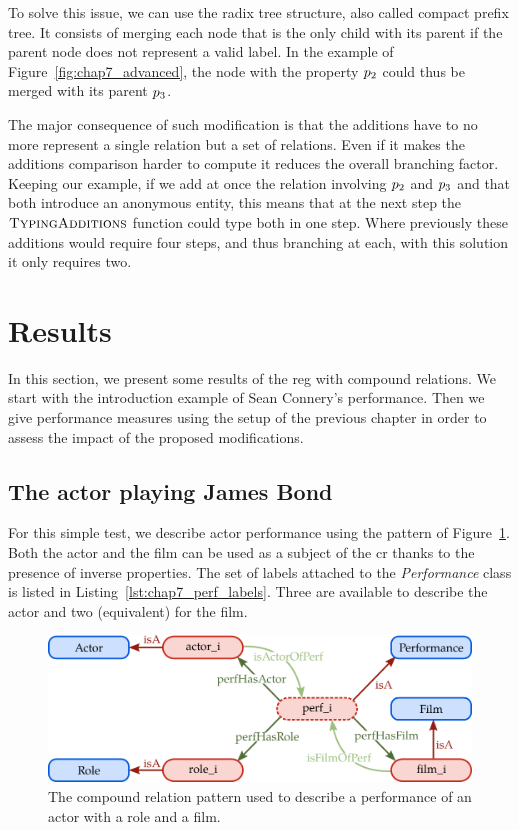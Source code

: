 To solve this issue, we can use the radix tree structure, also called compact prefix tree. It consists of merging each node that is the only child with its parent if the parent node does not represent a valid label. In the example of Figure~\ref{fig:chap7_advanced}, the node with the property $p_2$ could thus be merged with its parent $p_3$.

The major consequence of such modification is that the additions have to no more represent a single relation but a set of relations. Even if it makes the additions comparison harder to compute it reduces the overall branching factor. Keeping our example, if we add at once the relation involving $p_2$ and $p_3$ and that both introduce an anonymous entity, this means that at the next step the $\textsc{TypingAdditions}$ function could type both in one step. Where previously these additions would require four steps, and thus branching at each, with this solution it only requires two.

\section{Results}

In this section, we present some results of the \acrshort{reg} with compound relations. We start with the introduction example of Sean Connery's performance. Then we give performance measures using the setup of the previous chapter in order to assess the impact of the proposed modifications. 

\subsection{The actor playing James Bond}

For this simple test, we describe actor performance using the pattern of Figure~\ref{fig:chap7_perf}. Both the actor and the film can be used as a subject of the \acrshort{cr} thanks to the presence of inverse properties. The set of labels attached to the \textit{Performance} class is listed in Listing~\ref{lst:chap7_perf_labels}. Three are available to describe the actor and two (equivalent) for the film.

\newpage

\begin{figure}[ht!]
\centering
\includegraphics[scale=0.4]{figures/chapter7/perf.png}
\caption{\label{fig:chap7_perf} The compound relation pattern used to describe a performance of an actor with a role and a film.}
\end{figure}

